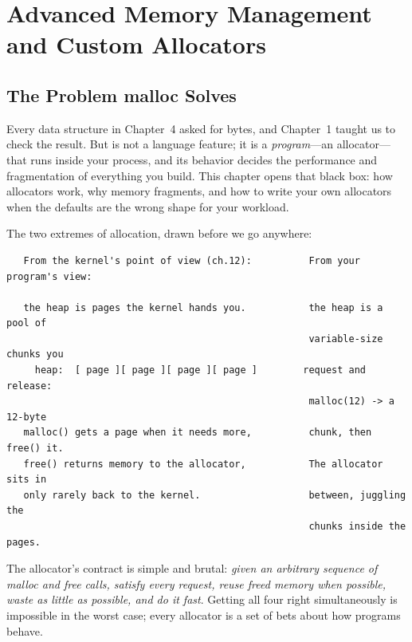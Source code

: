 
\chapter{Advanced Memory Management and Custom Allocators}

\section{The Problem malloc Solves}

Every data structure in Chapter~4 asked  for bytes, and
Chapter~1 taught us to check the result. But  is not a
language feature; it is a \emph{program}---an allocator---that runs
inside your process, and its behavior decides the performance and
fragmentation of everything you build. This chapter opens that black
box: how allocators work, why memory fragments, and how to write your
own allocators when the defaults are the wrong shape for your workload.

The two extremes of allocation, drawn before we go anywhere:

\begin{verbatim}
   From the kernel's point of view (ch.12):          From your program's view:

   the heap is pages the kernel hands you.           the heap is a pool of
                                                     variable-size chunks you
     heap:  [ page ][ page ][ page ][ page ]        request and release:
                                                     malloc(12) -> a 12-byte
   malloc() gets a page when it needs more,          chunk, then free() it.
   free() returns memory to the allocator,           The allocator sits in
   only rarely back to the kernel.                   between, juggling the
                                                     chunks inside the pages.
\end{verbatim}

The allocator's contract is simple and brutal: \emph{given an
arbitrary sequence of malloc and free calls, satisfy every request,
reuse freed memory when possible, waste as little as possible, and do
it fast}. Getting all four right simultaneously is impossible in the
worst case; every allocator is a set of bets about how programs
behave.

